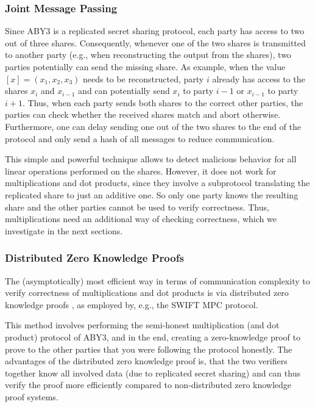 \documentclass[a4paper,11pt,
]{article}
\newcommand{\shared}[1]{\ensuremath{[{#1}]}}
\begin{document}
\subsubsection{Joint Message Passing} \label{sec::jmp}

Since ABY3 is a replicated secret sharing protocol, each party has access to two out of three shares. Consequently, whenever one of the two shares is transmitted to another party (e.g., when reconstructing the output from the shares), two parties potentially can send the missing share. As example, when the value $\shared{x} = (x_1, x_2, x_3)$ needs to be reconstructed, party $i$ already has access to the shares $x_i$ and $x_{i-1}$ and can potentially send $x_i$ to party $i-1$ or $x_{i-1}$ to party $i+1$. Thus, when each party sends both shares to the correct other parties, the parties can check whether the received shares match and abort otherwise. Furthermore, one can delay sending one out of the two shares to the end of the protocol and only send a hash of all messages to reduce communication.

This simple and powerful technique allows to detect malicious behavior for all linear operations performed on the shares. However, it does not work for multiplications and dot products, since they involve a subprotocol translating the replicated share to just an additive one. So only one party knows the resulting share and the other parties cannot be used to verify correctness. Thus, multiplications need an additional way of checking correctness, which we investigate in the next sections.

\subsubsection{Distributed Zero Knowledge Proofs} \label{sec::dzkp}

The (asymptotically) most efficient way in terms of communication complexity to verify correctness of multiplications and dot products is via distributed zero knowledge proofs \cite{DBLP:conf/ccs/BoyleGIN19}, as employed by, e.g., the SWIFT \cite{DBLP:conf/uss/KotiPPS21} MPC protocol.

This method involves performing the semi-honest multiplication (and dot product) protocol of ABY3, and in the end, creating a zero-knowledge proof to prove to the other parties that you were following the protocol honestly. The advantages of the distributed zero knowledge proof is, that the two verifiers together know all involved data (due to replicated secret sharing) and can thus verify the proof more efficiently compared to non-distributed zero knowledge proof systems.
\end{document}
